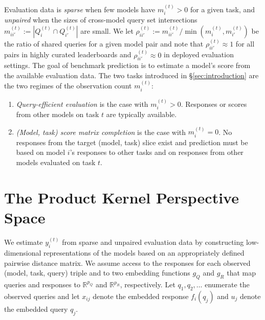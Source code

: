 \documentclass{article}
\theoremstyle{definition}
\theoremstyle{remark}
\theoremstyle{plain}
\begin{document}
Evaluation data is \emph{sparse} when few models have
$m_{i}^{(t)}>0$ for a given task, and \emph{unpaired} when the sizes of cross-model query set intersections 
$m_{ii'}^{(t)}:=|Q_{i}^{(t)}\cap Q_{i'}^{(t)}|$ are small. We let
$\rho_{ii'}^{(t)}:=m_{ii'}^{(t)}/\min(m_{i}^{(t)},m_{i'}^{(t)})$ be the ratio of shared queries for a
given model pair and note that $\rho_{ii'}^{(t)}\approx1$ for all pairs in highly curated
leaderboards and $\rho_{ii'}^{(t)}\approx0$ in deployed evaluation settings.
The goal of benchmark prediction is to estimate a model's score from the available
evaluation data.
The two tasks introduced in \S\ref{sec:introduction} are the two regimes of the
observation count $m_i^{(t)}$:
\begin{enumerate}[wide, labelwidth=1pt, labelindent=12pt]
\setlength{\itemsep}{1pt}\setlength{\parskip}{0pt}
\item \emph{Query-efficient evaluation} is the case
with $m_{i}^{(t)}>0$. Responses or scores from other models on task $t$ are
typically available.
\item \emph{(Model, task) score matrix completion} is the case with $m_{i}^{(t)}=0$.
No responses from the target (model, task) slice exist and prediction
must be based on model $i$'s responses to other tasks and on responses from
other models evaluated on task $t$.
\end{enumerate}

\section{The Product Kernel Perspective Space}
\label{sec:method}

We estimate $y_i^{(t)}$ from sparse and unpaired
evaluation data by constructing low-dimensional
representations of the models based on an appropriately defined pairwise distance
matrix.
We assume access to the responses for each observed (model, task, query) triple and
to two embedding functions $g_{Q}$ and $g_{R}$ that map
queries and responses to $\mathbb{R}^{p_{Q}}$ and $\mathbb{R}^{p_{R}}$, respectively.
Let $q_{1},q_{2},\hdots$ enumerate the observed queries and let
$x_{ij}$ denote the embedded response $f_{i}(q_{j})$ and $u_{j}$ denote the embedded
query $q_{j}$.
\end{document}
